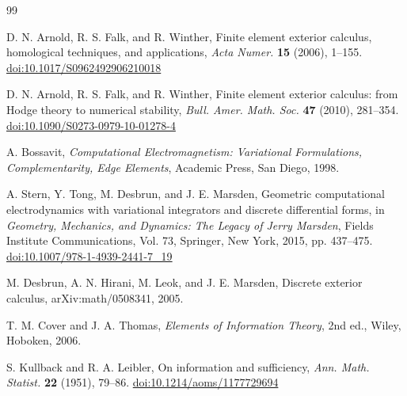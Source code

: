 \documentclass[11pt]{article}
\theoremstyle{remark}
\newcommand{\doi}[1]{\href{https://doi.org/#1}{doi:#1}}
\begin{document}
\begin{thebibliography}{99}

D. N. Arnold, R. S. Falk, and R. Winther,
Finite element exterior calculus, homological techniques,
and applications,
\emph{Acta Numer.}
\textbf{15} (2006), 1--155.
\doi{10.1017/S0962492906210018}

D. N. Arnold, R. S. Falk, and R. Winther,
Finite element exterior calculus: from Hodge theory to
numerical stability,
\emph{Bull. Amer. Math. Soc.}
\textbf{47} (2010), 281--354.
\doi{10.1090/S0273-0979-10-01278-4}

A. Bossavit,
\emph{Computational Electromagnetism:
Variational Formulations, Complementarity, Edge Elements},
Academic Press, San Diego, 1998.

A. Stern, Y. Tong, M. Desbrun, and J. E. Marsden,
Geometric computational electrodynamics with variational
integrators and discrete differential forms,
in
\emph{Geometry, Mechanics, and Dynamics:
The Legacy of Jerry Marsden},
Fields Institute Communications, Vol. 73,
Springer, New York, 2015, pp. 437--475.
\doi{10.1007/978-1-4939-2441-7\_19}

M. Desbrun, A. N. Hirani, M. Leok, and J. E. Marsden,
Discrete exterior calculus,
arXiv:math/0508341, 2005.

T. M. Cover and J. A. Thomas,
\emph{Elements of Information Theory},
2nd ed.,
Wiley, Hoboken, 2006.

S. Kullback and R. A. Leibler,
On information and sufficiency,
\emph{Ann. Math. Statist.}
\textbf{22} (1951), 79--86.
\doi{10.1214/aoms/1177729694}

\end{thebibliography}
\end{document}
